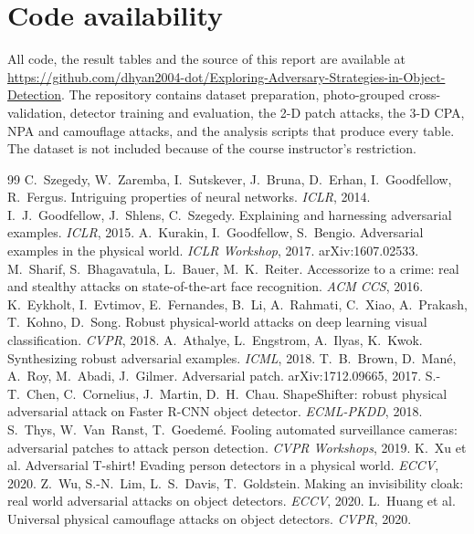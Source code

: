 \documentclass[11pt,a4paper]{article}
\newcommand{\repo}{https://github.com/dhyan2004-dot/Exploring-Adversary-Strategies-in-Object-Detection}
\begin{document}
\section*{Code availability}
All code, the result tables and the source of this report are available at \url{\repo}. The repository contains dataset preparation, photo-grouped cross-validation, detector training and evaluation, the 2-D patch attacks, the 3-D CPA, NPA and camouflage attacks, and the analysis scripts that produce every table. The dataset is not included because of the course instructor's restriction.

\begin{thebibliography}{99}\small
\setlength{\itemsep}{1pt}
 C.~Szegedy, W.~Zaremba, I.~Sutskever, J.~Bruna, D.~Erhan, I.~Goodfellow, R.~Fergus. Intriguing properties of neural networks. \emph{ICLR}, 2014.
 I.~J.~Goodfellow, J.~Shlens, C.~Szegedy. Explaining and harnessing adversarial examples. \emph{ICLR}, 2015.
 A.~Kurakin, I.~Goodfellow, S.~Bengio. Adversarial examples in the physical world. \emph{ICLR Workshop}, 2017. arXiv:1607.02533.
 M.~Sharif, S.~Bhagavatula, L.~Bauer, M.~K.~Reiter. Accessorize to a crime: real and stealthy attacks on state-of-the-art face recognition. \emph{ACM CCS}, 2016.
 K.~Eykholt, I.~Evtimov, E.~Fernandes, B.~Li, A.~Rahmati, C.~Xiao, A.~Prakash, T.~Kohno, D.~Song. Robust physical-world attacks on deep learning visual classification. \emph{CVPR}, 2018.
 A.~Athalye, L.~Engstrom, A.~Ilyas, K.~Kwok. Synthesizing robust adversarial examples. \emph{ICML}, 2018.
 T.~B.~Brown, D.~Man\'e, A.~Roy, M.~Abadi, J.~Gilmer. Adversarial patch. arXiv:1712.09665, 2017.
 S.-T.~Chen, C.~Cornelius, J.~Martin, D.~H.~Chau. ShapeShifter: robust physical adversarial attack on Faster R-CNN object detector. \emph{ECML-PKDD}, 2018.
 S.~Thys, W.~Van~Ranst, T.~Goedem\'e. Fooling automated surveillance cameras: adversarial patches to attack person detection. \emph{CVPR Workshops}, 2019.
 K.~Xu et al. Adversarial T-shirt! Evading person detectors in a physical world. \emph{ECCV}, 2020.
 Z.~Wu, S.-N.~Lim, L.~S.~Davis, T.~Goldstein. Making an invisibility cloak: real world adversarial attacks on object detectors. \emph{ECCV}, 2020.
 L.~Huang et al. Universal physical camouflage attacks on object detectors. \emph{CVPR}, 2020.

\end{thebibliography}
\end{document}
